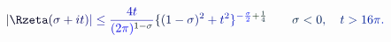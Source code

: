 \documentclass[12pt]{article}
\begin{document}
\makeatletter
\renewcommand*{\@textcolor}[3]{%
  \protect\leavevmode
  \begingroup
    \color#1{#2}#3%
  \endgroup
}
\makeatother
\begin{displaymath}
\mathcolor[RGB]{0,0,15}{|} \mathcolor[RGB]{0,0,30}{\Rzeta} \mathcolor[RGB]{0,0,45}{(} \mathcolor[RGB]{0,0,60}{\sigma} \mathcolor[RGB]{0,0,75}{+} \mathcolor[RGB]{0,0,90}{i} \mathcolor[RGB]{0,0,105}{t} \mathcolor[RGB]{0,0,120}{)} \mathcolor[RGB]{0,0,135}{|} \mathcolor[RGB]{0,0,150}{\le} \mathcolor[RGB]{0,0,165}{\frac { \mathcolor[RGB]{0,0,180}{4} \mathcolor[RGB]{0,0,195}{t} } { \mathcolor[RGB]{0,0,210}{(} \mathcolor[RGB]{0,0,225}{2} \mathcolor[RGB]{0,0,240}{\pi} \mathcolor[RGB]{0,0,255}{)} ^ { \mathcolor[RGB]{0,15,0}{1} \mathcolor[RGB]{0,15,15}{-} \mathcolor[RGB]{0,15,30}{\sigma} } } } \mathcolor[RGB]{0,15,45}{\{} \mathcolor[RGB]{0,15,60}{(} \mathcolor[RGB]{0,15,75}{1} \mathcolor[RGB]{0,15,90}{-} \mathcolor[RGB]{0,15,105}{\sigma} \mathcolor[RGB]{0,15,120}{)} ^ { \mathcolor[RGB]{0,15,135}{2} } \mathcolor[RGB]{0,15,150}{+} \mathcolor[RGB]{0,15,165}{t} ^ { \mathcolor[RGB]{0,15,180}{2} } \mathcolor[RGB]{0,15,195}{\}} ^ { \mathcolor[RGB]{0,15,210}{-} \mathcolor[RGB]{0,15,225}{\frac { \mathcolor[RGB]{0,15,240}{\sigma} } { \mathcolor[RGB]{0,15,255}{2} } } \mathcolor[RGB]{0,30,0}{+} \mathcolor[RGB]{0,30,15}{\frac { \mathcolor[RGB]{0,30,30}{1} } { \mathcolor[RGB]{0,30,45}{4} } } } \qquad \mathcolor[RGB]{0,30,60}{\sigma} \mathcolor[RGB]{0,30,75}{<} \mathcolor[RGB]{0,30,90}{0} \mathcolor[RGB]{0,30,105}{,} \quad \mathcolor[RGB]{0,30,120}{t} \mathcolor[RGB]{0,30,135}{>} \mathcolor[RGB]{0,30,150}{1} \mathcolor[RGB]{0,30,165}{6} \mathcolor[RGB]{0,30,180}{\pi} \mathcolor[RGB]{0,30,195}{.}
\end{displaymath}
\end{document}
